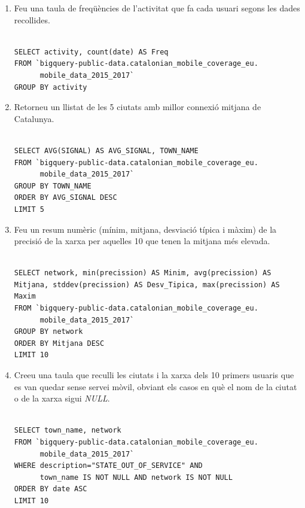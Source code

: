 \documentclass[12pt,longbibliography]{article}
\theoremstyle{definition}
\theoremstyle{remark}
\begin{document}
\begin{enumerate}

\item Feu una taula de freqüències de l'activitat que fa cada usuari segons les dades recollides.

\begin{Verbatim}[frame=single]

SELECT activity, count(date) AS Freq
FROM `bigquery-public-data.catalonian_mobile_coverage_eu.
      mobile_data_2015_2017`
GROUP BY activity

\end{Verbatim}

\item Retorneu un llistat de les 5 ciutats amb millor connexió mitjana de Catalunya.

\begin{Verbatim}[frame=single]

SELECT AVG(SIGNAL) AS AVG_SIGNAL, TOWN_NAME
FROM `bigquery-public-data.catalonian_mobile_coverage_eu.
      mobile_data_2015_2017`
GROUP BY TOWN_NAME
ORDER BY AVG_SIGNAL DESC
LIMIT 5

\end{Verbatim}

\item Feu un resum numèric (mínim, mitjana, desviació típica i màxim) de la precisió de la xarxa per aquelles 10 que tenen la mitjana més elevada.

\begin{Verbatim}[frame=single]

SELECT network, min(precission) AS Minim, avg(precission) AS 
Mitjana, stddev(precission) AS Desv_Tipica, max(precission) AS 
Maxim
FROM `bigquery-public-data.catalonian_mobile_coverage_eu.
      mobile_data_2015_2017`
GROUP BY network
ORDER BY Mitjana DESC
LIMIT 10

\end{Verbatim}

\item Creeu una taula que reculli les ciutats i la xarxa dels 10 primers usuaris que es van quedar sense servei mòvil, obviant els casos en què el nom de la ciutat o de la xarxa sigui \textit{NULL}.

\begin{Verbatim}[frame=single]

SELECT town_name, network
FROM `bigquery-public-data.catalonian_mobile_coverage_eu.
      mobile_data_2015_2017`
WHERE description="STATE_OUT_OF_SERVICE" AND 
      town_name IS NOT NULL AND network IS NOT NULL
ORDER BY date ASC
LIMIT 10


\end{Verbatim}
\end{enumerate}
\end{document}
